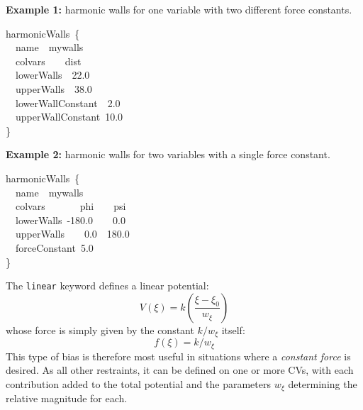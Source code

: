 \noindent\textbf{Example 1:} harmonic walls for one variable with two different force constants.
\begin{cvexampleinput}
\-harmonicWalls~\{\\
\-\-~~name~~mywalls\\
\-\-~~colvars~~~~dist\\
\-\-~~lowerWalls~~22.0~\\
\-\-~~upperWalls~~38.0~\\
\-\-~~lowerWallConstant~~2.0~\\
\-\-~~upperWallConstant~10.0~\\
\-\}
\end{cvexampleinput}

\noindent\textbf{Example 2:} harmonic walls for two variables with a single force constant.
\begin{cvexampleinput}
\-harmonicWalls~\{\\
\-\-~~name~~mywalls\\
\-\-~~colvars~~~~~~~phi~~~~psi\\
\-\-~~lowerWalls~-180.0~~~~0.0\\
\-\-~~upperWalls~~~~0.0~~180.0\\
\-\-~~forceConstant~5.0~\\
\-\}
\end{cvexampleinput}



The \texttt{linear} keyword defines a linear potential:
\begin{equation}
  \label{eq:colvarbias_linear}
  V\left(\xi\right) = k \left(\frac{\xi - \xi_0}{w_{\xi}}\right)
\end{equation}
\noindent{}whose force is simply given by the constant $k/w_\xi$ itself:
\begin{equation}
  \label{eq:colvarbias_linear_force}
  f(\xi) = k/w_\xi
\end{equation}
\noindent{}This type of bias is therefore most useful in situations where a \emph{constant force} is desired.  As all other restraints, it can be defined on one or more CVs, with each contribution added to the total potential and the parameters $w_\xi$ determining the relative magnitude for each.

